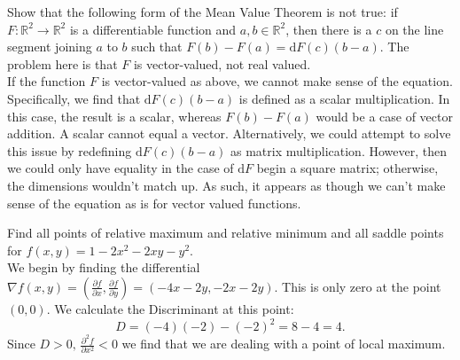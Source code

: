 \documentclass[12pt]{book}
\newcommand{\R}{\mathbb{R}}
\newenvironment{exercise}[2][Exercise]{\begin{trivlist}
\item[\hskip \labelsep {\bfseries #1}\hskip \labelsep {\bfseries #2.}]}{\end{trivlist}}
\begin{document}
\begin{exercise}{9.5.6}
    Show that the following form of the Mean Value Theorem is not true: if $F:\R^2 \to \R^2$ is a differentiable function and $a,b \in \R^2$, then there is a $c$ on the line segment joining $a$ to $b$ such that $F(b) - F(a) = \text{d} F(c) (b-a)$. The problem here is that $F$ is vector-valued, not real valued.  \\
    
    If the function $F$ is vector-valued as above, we cannot make sense of the equation. Specifically, we find that $\text{d} F(c) (b-a)$ is defined as a scalar multiplication. In this case, the result is a scalar, whereas $F(b)-F(a)$ would be a case of vector addition. A scalar cannot equal a vector. Alternatively, we could attempt to solve this issue by redefining $\text{d} F(c) (b-a)$ as matrix multiplication. However, then we could only have equality in the case of $\text{d} F$ begin a square matrix; otherwise, the dimensions wouldn't match up. As such, it appears as though we can't make sense of the equation as is for vector valued functions.
\end{exercise}



\begin{exercise}{9.5.8}
    Find all points of relative maximum and relative minimum and all saddle points for $f(x,y) = 1 - 2 x^2 - 2 x y- y^2$.  \\
    
    We begin by finding the differential $\nabla f(x,y) = \left( \frac{\partial f}{\partial x}, \frac{\partial f}{\partial y} \right) = \left( -4x-2y, -2x-2y \right)$. This is only zero at the point $(0,0)$. We calculate the Discriminant at this point:
        \[ D = (-4)(-2)- (-2)^2 = 8 -4 = 4. \]
    Since $D>0, \, \frac{\partial^2 f}{\partial x^2} < 0$ we find that we are dealing with a point of local maximum.
\end{exercise}
\end{document}
